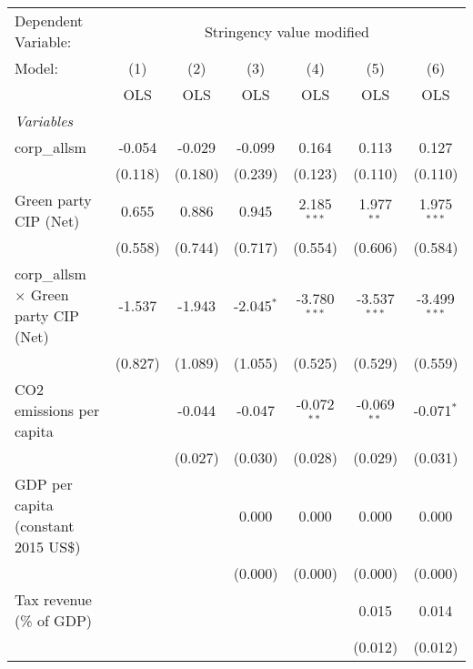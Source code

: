 
\begingroup
\centering
\begin{tabular}{lcccccc}
   \toprule
   Dependent Variable: & \multicolumn{6}{c}{Stringency value modified}\\
   Model:                                       & (1)     & (2)     & (3)          & (4)            & (5)            & (6)\\  
                                                &  OLS    & OLS     & OLS          & OLS            & OLS            & OLS\\  
   \midrule
   \emph{Variables}\\
   corp\_allsm                                  & -0.054  & -0.029  & -0.099       & 0.164          & 0.113          & 0.127\\   
                                                & (0.118) & (0.180) & (0.239)      & (0.123)        & (0.110)        & (0.110)\\   
   Green party CIP (Net)                        & 0.655   & 0.886   & 0.945        & 2.185$^{***}$  & 1.977$^{**}$   & 1.975$^{***}$\\   
                                                & (0.558) & (0.744) & (0.717)      & (0.554)        & (0.606)        & (0.584)\\   
   corp\_allsm $\times$ Green party CIP (Net)   & -1.537  & -1.943  & -2.045$^{*}$ & -3.780$^{***}$ & -3.537$^{***}$ & -3.499$^{***}$\\   
                                                & (0.827) & (1.089) & (1.055)      & (0.525)        & (0.529)        & (0.559)\\   
   CO2 emissions per capita                     &         & -0.044  & -0.047       & -0.072$^{**}$  & -0.069$^{**}$  & -0.071$^{*}$\\   
                                                &         & (0.027) & (0.030)      & (0.028)        & (0.029)        & (0.031)\\   
   GDP per capita (constant 2015 US\$)          &         &         & 0.000        & 0.000          & 0.000          & 0.000\\   
                                                &         &         & (0.000)      & (0.000)        & (0.000)        & (0.000)\\   
   Tax revenue (\% of GDP)                      &         &         &              &                & 0.015          & 0.014\\   
                                                &         &         &              &                & (0.012)        & (0.012)\\   

\end{tabular}
